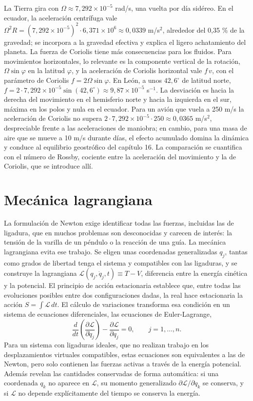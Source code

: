 \documentclass[10pt,openany]{book}
\begin{document}
La Tierra gira con \(\Omega \approx 7{,}292\times 10^{-5}\) rad/s, una vuelta por día sidéreo. En el ecuador, la aceleración centrífuga vale \(\Omega^{2}R = (7{,}292\times 10^{-5})^{2}\cdot 6{,}371\times 10^{6} \approx 0{,}0339\) m/s\(^2\), alrededor del 0,35 \% de la gravedad; se incorpora a la gravedad efectiva y explica el ligero achatamiento del planeta. La fuerza de Coriolis tiene más consecuencias para los fluidos. Para movimientos horizontales, lo relevante es la componente vertical de la rotación, \(\Omega\sin\varphi\) en la latitud \(\varphi\), y la aceleración de Coriolis horizontal vale \(f\,v\), con el parámetro de Coriolis \(f = 2\Omega\sin\varphi\). En León, a unos \(42{,}6^\circ\) de latitud norte, \(f = 2\cdot 7{,}292\times 10^{-5}\sin(42{,}6^\circ) \approx 9{,}87\times 10^{-5}\) s\(^{-1}\). La desviación es hacia la derecha del movimiento en el hemisferio norte y hacia la izquierda en el sur, máxima en los polos y nula en el ecuador. Para un avión que vuela a 250 m/s la aceleración de Coriolis no supera \(2\cdot 7{,}292\times 10^{-5}\cdot 250 \approx 0{,}0365\) m/s\(^2\), despreciable frente a las aceleraciones de maniobra; en cambio, para una masa de aire que se mueve a 10 m/s durante días, el efecto acumulado domina la dinámica y conduce al equilibrio geostrófico del capítulo 16. La comparación se cuantifica con el número de Rossby, cociente entre la aceleración del movimiento y la de Coriolis, que se introduce allí.

\section{Mecánica lagrangiana}

La formulación de Newton exige identificar todas las fuerzas, incluidas las de ligadura, que en muchos problemas son desconocidas y carecen de interés: la tensión de la varilla de un péndulo o la reacción de una guía. La mecánica lagrangiana evita ese trabajo. Se eligen unas coordenadas generalizadas \(q_j\), tantas como grados de libertad tenga el sistema y compatibles con las ligaduras, y se construye la lagrangiana \(\mathcal{L}(q_j, \dot q_j, t) \equiv T - V\), diferencia entre la energía cinética y la potencial. El principio de acción estacionaria establece que, entre todas las evoluciones posibles entre dos configuraciones dadas, la real hace estacionaria la acción \(S = \int \mathcal{L}\,dt\). El cálculo de variaciones transforma esa condición en un sistema de ecuaciones diferenciales, las ecuaciones de Euler-Lagrange,
\begin{equation}
\frac{d}{dt}\left(\frac{\partial \mathcal{L}}{\partial \dot q_j}\right) - \frac{\partial \mathcal{L}}{\partial q_j} = 0, \qquad j = 1,\ldots,n. \label{eq:c02-el}
\end{equation}
Para un sistema con ligaduras ideales, que no realizan trabajo en los desplazamientos virtuales compatibles, estas ecuaciones son equivalentes a las de Newton, pero solo contienen las fuerzas activas a través de la energía potencial. Además revelan las cantidades conservadas de forma automática: si una coordenada \(q_k\) no aparece en \(\mathcal{L}\), su momento generalizado \(\partial\mathcal{L}/\partial\dot q_k\) se conserva, y si \(\mathcal{L}\) no depende explícitamente del tiempo se conserva la energía.
\end{document}
